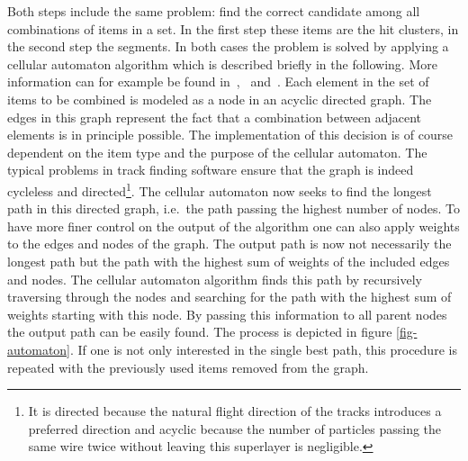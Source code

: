 Both steps include the same problem: find the correct candidate among all combinations of items in a set. In the first step these items are the hit clusters, in the second step the segments. In both cases the problem is solved by applying a cellular automaton algorithm which is described briefly in the following. More information can for example be found in~\cite{cats},~\cite{kisel} and~\cite{oliver}. Each element in the set of items to be combined is modeled as a node in an acyclic directed graph. The edges in this graph represent the fact that a combination between adjacent elements is in principle possible. The implementation of this decision is of course dependent on the item type and the purpose of the cellular automaton. The typical problems in track finding software ensure that the graph is indeed cycleless and directed\footnote{It is directed because the natural flight direction of the tracks introduces a preferred direction and acyclic because the number of particles passing the same wire twice without leaving this superlayer is negligible.}. The cellular automaton now seeks to find the longest path in this directed graph, i.e.\ the path passing the highest number of nodes. To have more finer control on the output of the algorithm one can also apply weights to the edges and nodes of the graph. The output path is now not necessarily the longest path but the path with the highest sum of weights of the included edges and nodes. The cellular automaton algorithm finds this path by recursively traversing through the nodes and searching for the path with the highest sum of weights starting with this node. By passing this information to all parent nodes the output path can be easily found. The process is depicted in figure \ref{fig-automaton}. If one is not only interested in the single best path, this procedure is repeated with the previously used items removed from the graph.

